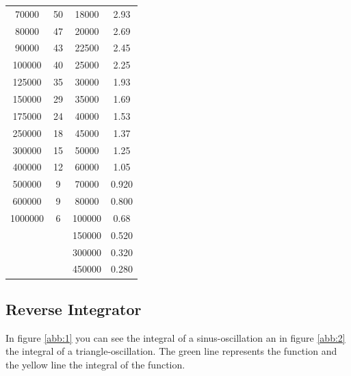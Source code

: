 \begin{table}
\begin{tabular}{c c | c c}
    70000   &  50  &  18000  &  2.93 \\
    80000   &  47  &  20000  &  2.69 \\
    90000   &  43  &  22500  &  2.45 \\
    100000  &  40  &  25000  &  2.25 \\
    125000  &  35  &  30000  &  1.93 \\
    150000  &  29  &  35000  &  1.69 \\
    175000  &  24  &  40000  &  1.53 \\
    250000  &  18  &  45000  &  1.37 \\
    300000  &  15  &  50000  &  1.25 \\
    400000  &  12  &  60000  &  1.05 \\
    500000  &  9   &  70000  &  0.920 \\
    600000  &  9   &  80000  &  0.800 \\
    1000000 &  6   &  100000 &  0.68  \\
            &      &  150000 &  0.520 \\
            &      &  300000 &  0.320 \\
            &      &  450000 &  0.280 \\
    \bottomrule
  \end{tabular}
\end{table}



\subsection{Reverse Integrator}
In figure \ref{abb:1} you can see the integral of a sinus-oscillation an in
figure \ref{abb:2} the integral of a triangle-oscillation.
The green line represents the function and the yellow line the integral of
the function.


